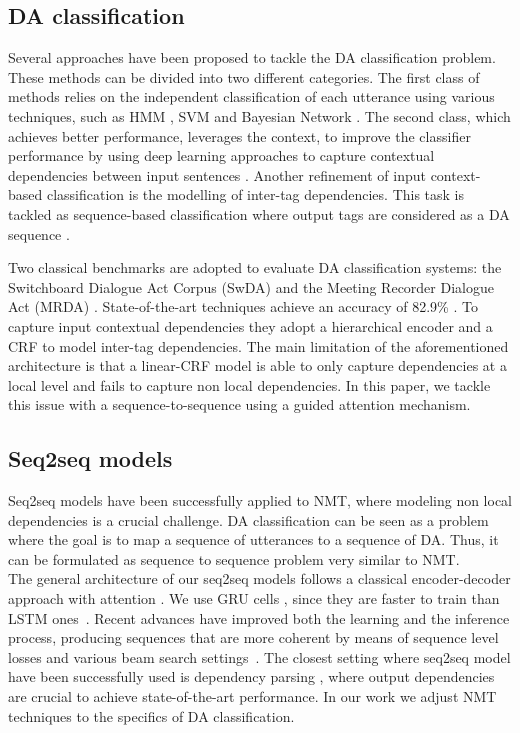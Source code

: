 \documentclass[letterpaper]{article} \usepackage{aaai20}  \usepackage{times}  \usepackage{helvet} \usepackage{courier}  \usepackage[hyphens]{url}  \usepackage{graphicx} \urlstyle{rm} \def\UrlFont{\rm}  \usepackage{graphicx}  \frenchspacing  \setlength{\pdfpagewidth}{8.5in}  \setlength{\pdfpageheight}{11in}
\newcommand{\citet}[1]{\citeauthor{#1} \shortcite{#1}}
\begin{document}
\subsection{DA classification}
Several approaches have been proposed to tackle the DA classification problem. These methods can be divided into two different categories. The first class of methods relies on the independent classification of each utterance using various techniques, such as HMM \cite{handcrafted_HMM}, SVM \cite{svm_dialog} and Bayesian Network \cite{bayesian_dialog}. 
The second class, which achieves better performance, leverages the context, to improve the classifier performance by using deep learning approaches to capture contextual dependencies between input sentences \cite{RNN_CTX3_Softmax,LSTM_softmax}. Another refinement of input context-based classification is the modelling of inter-tag dependencies. This task is tackled as sequence-based classification where output tags are considered as a DA sequence \cite{crf_multi_task,hierarchical_LSTM_CRF,handcrafted_HMM,LSTM_CRF,DAClassifCxt}. 

Two classical benchmarks are adopted to evaluate DA classification systems: the Switchboard Dialogue Act Corpus (SwDA)\cite{switchboard_da} and the Meeting Recorder Dialogue Act (MRDA) \cite{mrda}. State-of-the-art techniques achieve an accuracy of 82.9\% \cite{crf_multi_task,DAClassifCxt}. To capture input contextual dependencies they adopt a hierarchical encoder and a CRF to model inter-tag dependencies. The main limitation of the aforementioned architecture is that a linear-CRF model is able to only capture dependencies at a local level and fails to capture non local dependencies. In this paper, we tackle this issue with a sequence-to-sequence using a guided attention mechanism.

\subsection{Seq2seq models}
Seq2seq models have been successfully applied to NMT, where modeling non local dependencies is a crucial challenge. DA classification can be seen as a problem where the goal is to map a sequence of utterances to a sequence of DA. Thus, it can be formulated as sequence to sequence problem very similar to NMT.\\
The general architecture of our seq2seq models \cite{seq2seq} follows a classical encoder-decoder approach with attention \cite{attention}. We use GRU cells \cite{grupaper}, since they are faster to train than LSTM ones~\cite{lstm_gru}. Recent advances have improved both the learning and the inference process, producing sequences that are more coherent by means of sequence level losses \citet{beam_seach_optimization} and various beam search settings~\cite{beam_search_alpha,dbs}. The closest setting where seq2seq model have been successfully used is dependency parsing \cite{dependancy}, where output dependencies are crucial to achieve state-of-the-art performance. In our work we adjust NMT techniques to the specifics of DA classification.
\end{document}
